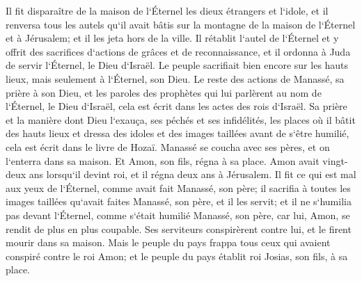 \verse Il fit disparaître de la maison de l`Éternel les dieux étrangers et l`idole, et il renversa tous les autels qu`il avait bâtis sur la montagne de la maison de l`Éternel et à Jérusalem; et il les jeta hors de la ville. 
\verse Il rétablit l`autel de l`Éternel et y offrit des sacrifices d`actions de grâces et de reconnaissance, et il ordonna à Juda de servir l`Éternel, le Dieu d`Israël. 
\verse Le peuple sacrifiait bien encore sur les hauts lieux, mais seulement à l`Éternel, son Dieu. 
\verse Le reste des actions de Manassé, sa prière à son Dieu, et les paroles des prophètes qui lui parlèrent au nom de l`Éternel, le Dieu d`Israël, cela est écrit dans les actes des rois d`Israël. 
\verse Sa prière et la manière dont Dieu l`exauça, ses péchés et ses infidélités, les places où il bâtit des hauts lieux et dressa des idoles et des images taillées avant de s`être humilié, cela est écrit dans le livre de Hozaï. 
\verse Manassé se coucha avec ses pères, et on l`enterra dans sa maison. Et Amon, son fils, régna à sa place. 
\verse Amon avait vingt-deux ans lorsqu`il devint roi, et il régna deux ans à Jérusalem. 
\verse Il fit ce qui est mal aux yeux de l`Éternel, comme avait fait Manassé, son père; il sacrifia à toutes les images taillées qu`avait faites Manassé, son père, et il les servit; 
\verse et il ne s`humilia pas devant l`Éternel, comme s`était humilié Manassé, son père, car lui, Amon, se rendit de plus en plus coupable. 
\verse Ses serviteurs conspirèrent contre lui, et le firent mourir dans sa maison. 
\verse Mais le peuple du pays frappa tous ceux qui avaient conspiré contre le roi Amon; et le peuple du pays établit roi Josias, son fils, à sa place. 

\chapter{}

